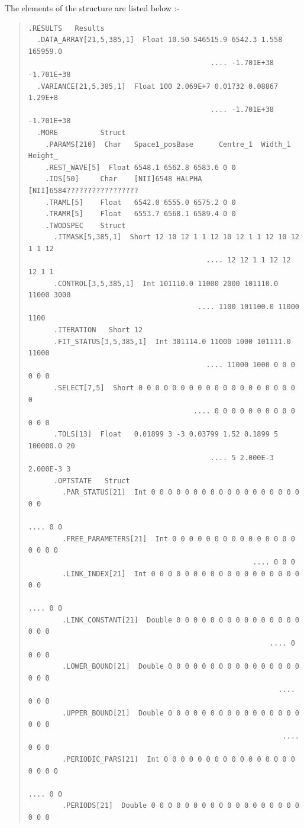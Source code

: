  The elements of the structure are listed below :-

\begin{quote}
\small
\begin{verbatim}
.RESULTS   Results
  .DATA_ARRAY[21,5,385,1]  Float 10.50 546515.9 6542.3 1.558 165959.0
                                           .... -1.701E+38 -1.701E+38
  .VARIANCE[21,5,385,1]  Float 100 2.069E+7 0.01732 0.08867 1.29E+8
                                           .... -1.701E+38 -1.701E+38
  .MORE          Struct
    .PARAMS[210]  Char   Space1_posBase      Centre_1  Width_1   Height_
    .REST_WAVE[5]  Float 6548.1 6562.8 6583.6 0 0
    .IDS[50]     Char    [NII]6548 HALPHA    [NII]6584?????????????????
    .TRAML[5]    Float   6542.0 6555.0 6575.2 0 0
    .TRAMR[5]    Float   6553.7 6568.1 6589.4 0 0
    .TWODSPEC    Struct
      .ITMASK[5,385,1]  Short 12 10 12 1 1 12 10 12 1 1 12 10 12 1 1 12
                                          .... 12 12 1 1 12 12 12 1 1
      .CONTROL[3,5,385,1]  Int 101110.0 11000 2000 101110.0 11000 3000
                                        .... 1100 101100.0 11000 1100
      .ITERATION   Short 12
      .FIT_STATUS[3,5,385,1]  Int 301114.0 11000 1000 101111.0 11000
                                          .... 11000 1000 0 0 0 0 0 0
      .SELECT[7,5]  Short 0 0 0 0 0 0 0 0 0 0 0 0 0 0 0 0 0 0 0 0
                                       .... 0 0 0 0 0 0 0 0 0 0 0 0 0
      .TOLS[13]  Float   0.01899 3 -3 0.03799 1.52 0.1899 5 100000.0 20
                                           .... 5 2.000E-3 2.000E-3 3
      .OPTSTATE   Struct
        .PAR_STATUS[21]  Int 0 0 0 0 0 0 0 0 0 0 0 0 0 0 0 0 0 0 0 0
                                                             .... 0 0
        .FREE_PARAMETERS[21]  Int 0 0 0 0 0 0 0 0 0 0 0 0 0 0 0 0 0 0 0
                                                     .... 0 0 0
        .LINK_INDEX[21]  Int 0 0 0 0 0 0 0 0 0 0 0 0 0 0 0 0 0 0 0 0
                                                             .... 0 0
        .LINK_CONSTANT[21]  Double 0 0 0 0 0 0 0 0 0 0 0 0 0 0 0 0 0 0
                                                         .... 0 0 0 0
        .LOWER_BOUND[21]  Double 0 0 0 0 0 0 0 0 0 0 0 0 0 0 0 0 0 0 0
                                                           .... 0 0 0
        .UPPER_BOUND[21]  Double 0 0 0 0 0 0 0 0 0 0 0 0 0 0 0 0 0 0 0
                                                            .... 0 0 0
        .PERIODIC_PARS[21]  Int 0 0 0 0 0 0 0 0 0 0 0 0 0 0 0 0 0 0 0 0
                                                             .... 0 0
        .PERIODS[21]  Double 0 0 0 0 0 0 0 0 0 0 0 0 0 0 0 0 0 0 0 0 0

\end{verbatim}
\end{quote}
